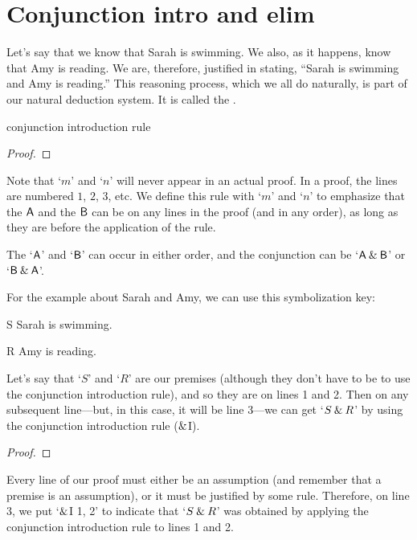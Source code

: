 \section{Conjunction intro and elim}\label{s:conj-rule}

Let's say that we know that Sarah is swimming. We also, as it happens, know that Amy is reading. We are, therefore, justified in stating, ``Sarah is swimming and Amy is reading.'' 
This reasoning process, which we all do naturally, is part of our natural deduction system. It is called the . 
\begin{factboxy}{conjunction introduction rule}
\begin{proof}
	 
\end{proof}
\tcblower
\footnotesize{Note that `$m$' and `$n$' will never appear in an actual proof. In a proof, the lines are numbered $1$, $2$, $3$, etc. We define this rule with `$m$' and `$n$' to emphasize that the $\mathsf{A}$ and the $\mathsf{B}$ can be on any lines in the proof (and in any order), as long as they are before the application of the rule.}
\end{factboxy}

\noindent The `$\mathsf{A}$' and `$\mathsf{B}$' can occur in either order, and the conjunction can be `$\mathsf{A} \mathbin{\&} \mathsf{B}$' or `$\mathsf{B} \mathbin{\&} \mathsf{A}$'.

For the example about Sarah and Amy, we can use this symbolization key:
	\begin{ekey}
		\item[S] Sarah is swimming.
		\item[R] Amy is reading.
	\end{ekey}
Let's say that `$S$' and `$R$' are our premises (although they don't have to be to use the conjunction introduction rule), and so they are on lines 1 and 2. Then on any subsequent line---but, in this case, it will be line 3---we can get `$S \mathbin{\&} R$' by using the conjunction introduction rule ($\mathbin{\&}$I).
\begin{proof}
	 \pr{}
	 \pr{}
	 
\end{proof}

Every line of our proof must either be an assumption (and remember that a premise is an assumption), or it must be justified by some rule. Therefore, on line 3, we put `$\mathbin{\&}$I 1, 2' to indicate that `$S \mathbin{\&} R$' was obtained by applying the conjunction introduction rule to lines 1 and 2. 

